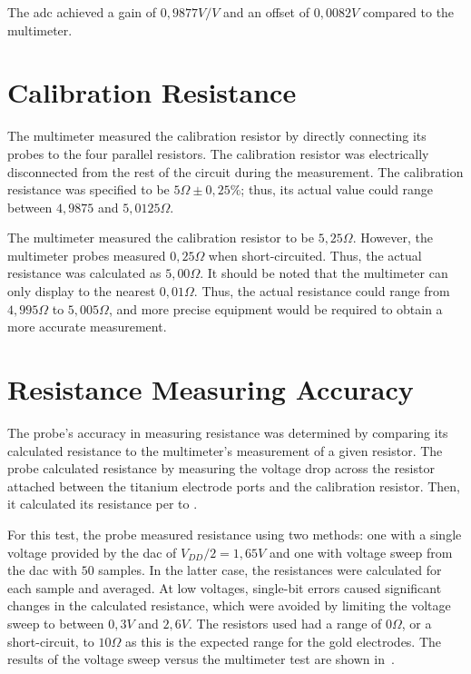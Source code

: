 The \gls{adc} achieved a gain of $0,9877V/V$ and an offset of $0,0082V$ compared to the multimeter.

\section{Calibration Resistance}\label{sec:calibration-resistance}

The multimeter measured the calibration resistor by directly connecting its probes to the four parallel resistors.
The calibration resistor was electrically disconnected from the rest of the circuit during the measurement.
The calibration resistance was specified to be $5\Omega \pm 0,25\%$; thus, its actual value could range between $4,9875$ and $5,0125\Omega$.

The multimeter measured the calibration resistor to be $5,25\Omega$.
However, the multimeter probes measured $0,25\Omega$ when short-circuited.
Thus, the actual resistance was calculated as $5,00\Omega$.
It should be noted that the multimeter can only display to the nearest $0,01\Omega$.
Thus, the actual resistance could range from $4,995\Omega$ to $5,005\Omega$, and more precise equipment would be required to obtain a more accurate measurement.

\section{Resistance Measuring Accuracy}\label{sec:resistance-measuring-accuracy}

The probe's accuracy in measuring resistance was determined by comparing its calculated resistance to the multimeter's measurement of a given resistor.
The probe calculated resistance by measuring the voltage drop across the resistor attached between the titanium electrode ports and the calibration resistor. 
Then, it calculated its resistance per  to .

For this test, the probe measured resistance using two methods: one with a single voltage provided by the \gls{dac} of $V_{DD}/2 = 1,65V$ and one with voltage sweep from the \gls{dac} with $50$ samples.
In the latter case, the resistances were calculated for each sample and averaged.
At low voltages, single-bit errors caused significant changes in the calculated resistance, which were avoided by limiting the voltage sweep to between $0,3V$ and $2,6V$.
The resistors used had a range of $0\Omega$, or a short-circuit, to $10\Omega$ as this is the expected range for the gold electrodes.
The results of the voltage sweep versus the multimeter test are shown in~. 

